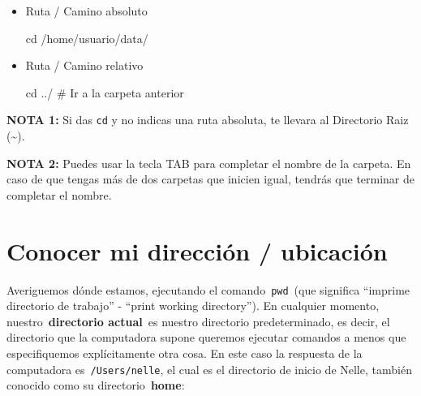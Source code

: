\documentclass[
  spanish,
  12pt,
  letterpaper,
  DIV=11,
  numbers=noendperiod]{scrreprt}
\newenvironment{Shaded}{\begin{snugshade}}{\end{snugshade}}
\newcommand{\BuiltInTok}[1]{\textcolor[rgb]{0.00,0.23,0.31}{#1}}
\newcommand{\CommentTok}[1]{\textcolor[rgb]{0.37,0.37,0.37}{#1}}
\newcommand{\NormalTok}[1]{\textcolor[rgb]{0.00,0.23,0.31}{#1}}
\begin{document}
\begin{itemize}
\item
  Ruta / Camino absoluto

\begin{Shaded}
\begin{Highlighting}[]
\BuiltInTok{cd}\NormalTok{ /home/usuario/data/}
\end{Highlighting}
\end{Shaded}
\item
  Ruta / Camino relativo

\begin{Shaded}
\begin{Highlighting}[]
\BuiltInTok{cd}\NormalTok{ ../ }\CommentTok{\# Ir a la carpeta anterior}
\end{Highlighting}
\end{Shaded}
\end{itemize}

\begin{tcolorbox}[enhanced jigsaw, arc=.35mm, bottomrule=.15mm, bottomtitle=1mm, breakable, colback=white, colbacktitle=quarto-callout-note-color!10!white, colframe=quarto-callout-note-color-frame, coltitle=black, left=2mm, leftrule=.75mm, opacityback=0, opacitybacktitle=0.6, rightrule=.15mm, title=\textcolor{quarto-callout-note-color}{\faInfo}\hspace{0.5em}{Nota}, titlerule=0mm, toprule=.15mm, toptitle=1mm]

\textbf{NOTA 1:} Si das \texttt{cd} y no indicas una ruta absoluta, te
llevara al Directorio Raiz (\textasciitilde).

\textbf{NOTA 2:} Puedes usar la tecla TAB para completar el nombre de la
carpeta. En caso de que tengas más de dos carpetas que inicien igual,
tendrás que terminar de completar el nombre.

\end{tcolorbox}

\section{Conocer mi dirección /
ubicación}\label{conocer-mi-direcciuxf3n-ubicaciuxf3n}

Averiguemos dónde estamos, ejecutando el comando~\texttt{pwd}~(que
significa ``imprime directorio de trabajo'' - ``print working
directory''). En cualquier momento, nuestro~\textbf{directorio
actual}~es nuestro directorio predeterminado, es decir, el directorio
que la computadora supone queremos ejecutar comandos a menos que
especifiquemos explícitamente otra cosa. En este caso la respuesta de la
computadora es~\texttt{/Users/nelle}, el cual es el directorio de inicio
de Nelle, también conocido como su directorio~\textbf{home}:
\end{document}
